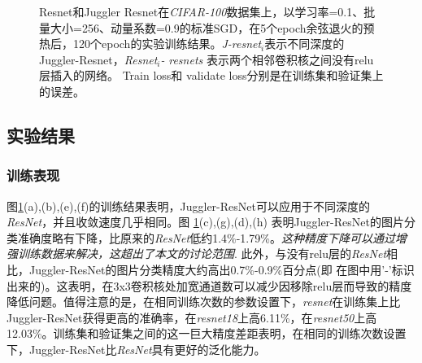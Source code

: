 \begin{figure}[!t]
	
	\caption{
		Resnet和Juggler Resnet在\emph{CIFAR-100}数据集上，以学习率=0.1、批量大小=256、动量系数=0.9的标准SGD，在5个epoch余弦退火的预热后，120个epoch的实验训练结果。\emph{J-resnet$_i$}表示不同深度的Juggler-Resnet，\emph{Resnet$_i$-} \emph{resnets} 表示两个相邻卷积核之间没有relu层插入的网络。 Train loss和 validate loss分别是在训练集和验证集上的误差。}
	\label{train_results}
\end{figure}

\subsection{实验结果}
\subsubsection{训练表现}
图\ref{train_results}(a),(b),(e),(f)的训练结果表明，Juggler-ResNet可以应用于不同深度的\emph{ResNet}，并且收敛速度几乎相同。图 \ref{train_results}(c),(g),(d),(h) 表明Juggler-ResNet的图片分类准确度略有下降，比原来的\emph{ResNet}低约1.4\%-1.79\%。\emph{这种精度下降可以通过增强训练数据来解决，这超出了本文的讨论范围}. 此外，与没有relu层的\emph{ResNet}相比，Juggler-ResNet的图片分类精度大约高出0.7\%-0.9\%百分点(即 在图中用'-'标识出来的)。这表明，在3x3卷积核处加宽通道数可以减少因移除relu层而导致的精度降低问题。值得注意的是，在相同训练次数的参数设置下，\emph{resnet}在训练集上比Juggler-ResNet获得更高的准确率，在\emph{resnet18}上高6.11\%，在\emph{resnet50}上高12.03\%。训练集和验证集之间的这一巨大精度差距表明，在相同的训练次数设置下，Juggler-ResNet比\emph{ResNet}具有更好的泛化能力。

